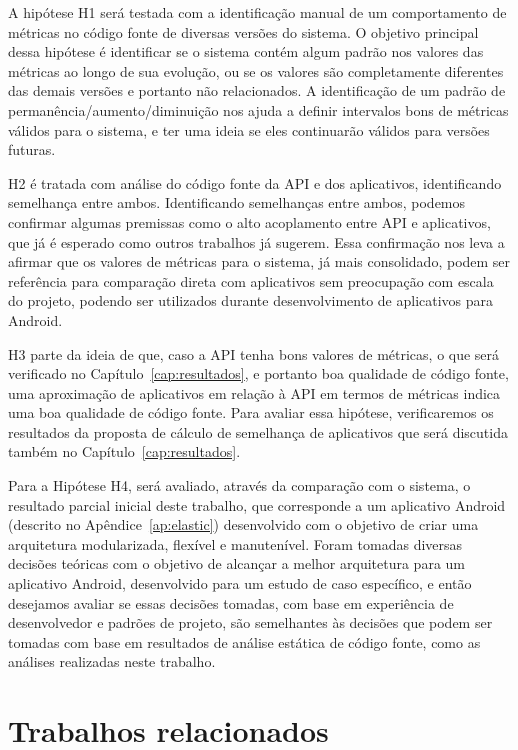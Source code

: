 A hipótese H1 será testada com a identificação manual de um comportamento de métricas no código fonte de diversas versões do sistema. O objetivo principal dessa hipótese é identificar se o sistema contém algum padrão nos valores das métricas ao longo de sua evolução, ou se os valores são completamente diferentes das demais versões e portanto não relacionados. A identificação de um padrão de permanência/aumento/diminuição nos ajuda a definir intervalos bons de métricas válidos para o sistema, e ter uma ideia se eles continuarão válidos para versões futuras.

H2 é tratada com análise do código fonte da API e dos aplicativos, identificando semelhança entre ambos. Identificando semelhanças entre ambos, podemos confirmar algumas premissas como o alto acoplamento entre API e aplicativos, que já é esperado como outros trabalhos já sugerem. Essa confirmação nos leva a afirmar que os valores de métricas para o sistema, já mais consolidado, podem ser referência para comparação direta com aplicativos sem preocupação com escala do projeto, podendo ser utilizados durante desenvolvimento de aplicativos para Android.

H3 parte da ideia de que, caso a API tenha bons valores de métricas, o que será verificado no Capítulo~\ref{cap:resultados}, e portanto boa qualidade de código fonte, uma aproximação de aplicativos em relação à API em termos de métricas indica uma boa qualidade de código fonte. Para avaliar essa hipótese, verificaremos os resultados da proposta de cálculo de semelhança de aplicativos que será discutida também no Capítulo~\ref{cap:resultados}.

Para a Hipótese H4, será avaliado, através da comparação com o sistema, o resultado parcial inicial deste trabalho, que corresponde a um aplicativo Android (descrito no Apêndice~\ref{ap:elastic}) desenvolvido com o objetivo de criar uma arquitetura modularizada, flexível e manutenível. Foram tomadas diversas decisões teóricas com o objetivo de alcançar a melhor arquitetura para um aplicativo Android, desenvolvido para um estudo de caso específico, e então desejamos avaliar se essas decisões tomadas, com base em experiência de desenvolvedor e padrões de projeto, são semelhantes às decisões que podem ser tomadas com base em resultados de análise estática de código fonte, como as análises realizadas neste trabalho.

\section{Trabalhos relacionados}

